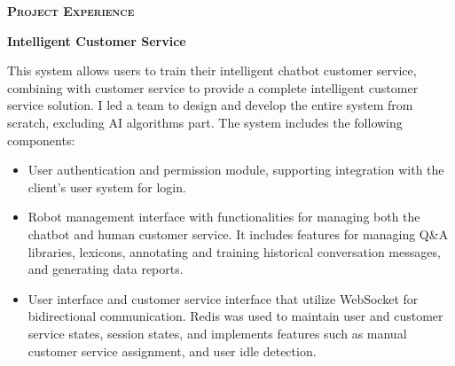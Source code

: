 \documentclass[a4paper]{article}
\newenvironment{changemargin}[2]{%
  \begin{list}{}{%
    \setlength{\topsep}{0pt}%
    \setlength{\leftmargin}{#1}%
    \setlength{\rightmargin}{#2}%
    \setlength{\listparindent}{\parindent}%
    \setlength{\itemindent}{\parindent}%
    \setlength{\parsep}{\parskip}%
  }%
  \item[]}{\end{list}
}
\newcommand{\lineover}{
	\begin{changemargin}{-0.05in}{-0.05in}
		\vspace*{-8pt}
		\hrulefill \\
		\vspace*{-2pt}
	\end{changemargin}
}
\newcommand{\header}[1]{
	\begin{changemargin}{-0.5in}{-0.5in}
		\scshape{\large \textbf{#1}}\\
	\end{changemargin}
}
\newenvironment{body} {
	\vspace*{-16pt}
	\begin{changemargin}{-0.5in}{-0.5in}
  }
	{\end{changemargin}
}
\begin{document}
\medskip

\header{Project Experience}
\begin{body}

	\vspace{16pt}
	
	\textbf{Intelligent Customer Service}\\

	\begin{justify} 
		This system allows users to train their intelligent chatbot customer service, combining with customer service to provide a complete intelligent customer service solution. I led a team to design and develop the entire system from scratch, excluding AI algorithms part. The system includes the following components:
	\end{justify}

	\smallskip

	\vspace*{-8pt}
	\begin{itemize} \itemsep -0pt  %
		\item \begin{justify} 
			User authentication and permission module, supporting integration with the client's user system for login.
		\end{justify} 
	\end{itemize}

	\vspace*{-8pt}
	\begin{itemize} \itemsep -0pt  %
		\item \begin{justify}
			Robot management interface with functionalities for managing both the chatbot and human customer service. It includes features for managing Q\&A libraries, lexicons, annotating and training historical conversation messages, and generating data reports.
		\end{justify} 
	\end{itemize}

	\vspace*{-8pt}
	\begin{itemize} \itemsep -0pt  %
		\item \begin{justify} 
			User interface and customer service interface that utilize WebSocket for bidirectional communication. Redis was used to maintain user and customer service states, session states, and implements features such as manual customer service assignment, and user idle detection.
		\end{justify}
	\end{itemize}


\end{body}
\end{document}
